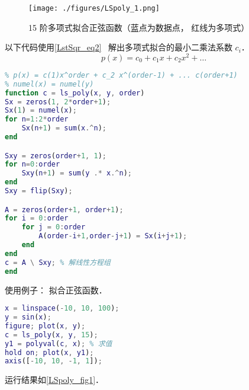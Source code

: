 

\begin{figure}[ht]
\centering
\texttt{[image: ./figures/LSpoly\_1.png]}
\caption{15 阶多项式拟合正弦函数（蓝点为数据点， 红线为多项式）} \label{LSpoly_fig1}
\end{figure}

以下代码使用\autoref{LstSqr_eq2}~ 解出多项式拟合的最小二乘法系数 $c_i$．
\begin{equation}
p(x) = c_0 + c_1 x + c_2 x^2 + \dots
\end{equation}

\begin{lstlisting}[language=matlab, caption=ls_poly.m]
% 多项式最小二乘法拟合
% p(x) = c(1)x^order + c_2 x^(order-1) + ... c(order+1)
% numel(x) = numel(y)
function c = ls_poly(x, y, order)
Sx = zeros(1, 2*order+1);
Sx(1) = numel(x);
for n=1:2*order
    Sx(n+1) = sum(x.^n);
end

Sxy = zeros(order+1, 1);
for n=0:order
    Sxy(n+1) = sum(y .* x.^n);
end
Sxy = flip(Sxy);

A = zeros(order+1, order+1);
for i = 0:order
    for j = 0:order
        A(order-i+1,order-j+1) = Sx(i+j+1);
    end
end
c = A \ Sxy; % 解线性方程组
end
\end{lstlisting}

使用例子： 拟合正弦函数．
\begin{lstlisting}[language=matlab, caption=ls_poly_demo.m]
% ls_poly_demo
x = linspace(-10, 10, 100);
y = sin(x);
figure; plot(x, y);
c = ls_poly(x, y, 15);
y1 = polyval(c, x); % 求值
hold on; plot(x, y1);
axis([-10, 10, -1, 1]);
\end{lstlisting}
运行结果如\autoref{LSpoly_fig1}．
